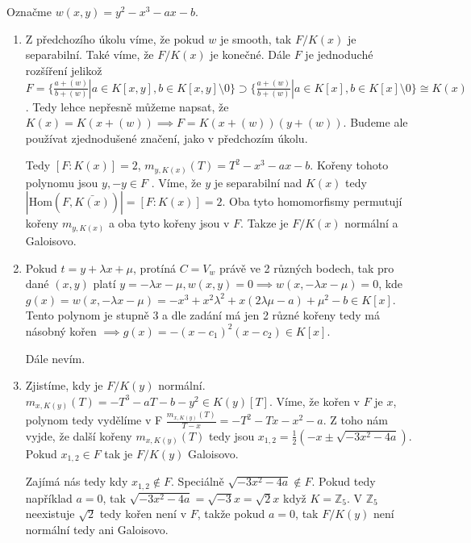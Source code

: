 \documentclass[12pt, a4paper]{article}
\begin{document}
\section{}
Označme $w(x,y)=y^2-x^3-ax-b$.
\begin{enumerate}[label=(\alph*)]
    \item Z předchozího úkolu víme, že pokud $w$ je smooth, tak $F/K(x)$ je separabilní. Také víme, že $F/K(x)$ je konečné. Dále $F$ je jednoduché rozšíření jelikož $F = \{\frac{a+(w)}{b+(w)}| a \in K[x,y], b \in K[x,y] \setminus 0 \} \supset \{\frac{a+(w)}{b+(w)}| a \in K[x], b \in K[x] \setminus 0 \} \cong K(x)$. Tedy lehce nepřesně můžeme napsat, že $K(x)=K(x+(w)) \implies F = K(x+(w))(y+(w))$. Budeme ale používat zjednodušené značení, jako v předchozím úkolu. 

    Tedy $[F:K(x)]=2$, $m_{y,K(x)}(T)=T^2 - x^3 - ax -b$. Kořeny tohoto polynomu jsou $y,-y \in F$ . Víme, že $y$ je separabilní nad $K(x)$ tedy  $|\text{Hom}(F,\bar{K(x)})|=[F:K(x)]=2$. Oba tyto homomorfismy permutují kořeny $m_{y,K(x)}$ a oba tyto kořeny jsou v $F$. Takze je $F/K(x)$ normální a Galoisovo.
    \item Pokud $t=y+\lambda x + \mu$, protíná $C=V_w$ právě ve 2 různých bodech, tak pro dané $(x,y)$ platí $y=-\lambda x - \mu, w(x,y)=0 \implies w(x,-\lambda x - \mu) = 0$, kde $g(x)=w(x,-\lambda x - \mu) = -x^3+x^2 \lambda^2 + x(2\lambda \mu -a)+\mu^2 -b \in K[x]$. Tento polynom je stupně $3$ a dle zadání má jen 2 různé kořeny tedy má násobný kořen $\implies g(x)=-(x-c_1)^2(x-c_2) \in K[x]$. 

    Dále nevím.

    \item Zjistíme, kdy je $F/K(y)$ normální. $m_{x,K(y)}(T) = -T^3-aT-b-y^2 \in K(y)[T]$. Víme, že kořen v $F$ je $x$, polynom tedy vydělíme v F $\frac{m_{x,K(y)}(T)}{T-x} = -T^2-Tx-x^2-a$. Z toho nám vyjde, že další kořeny $m_{x,K(y)}(T)$ tedy jsou $x_{1,2} = \frac{1}{2}(-x\pm \sqrt{-3x^2-4a})$. Pokud $x_{1,2} \in F$ tak je $F/K(y)$ Galoisovo. 

    Zajímá nás tedy kdy $x_{1,2} \notin F$. Speciálně $\sqrt{-3x^2-4a} \notin F$. Pokud tedy například $a = 0$, tak $\sqrt{-3x^2-4a}=\sqrt{-3}x = \sqrt{2}x$ když $K = \mathbb{Z}_5$. V $\mathbb{Z}_5$ neexistuje $\sqrt{2}$ tedy kořen není v $F$, takže pokud $a=0$, tak $F/K(y)$ není normální tedy ani Galoisovo.
\end{enumerate}
\end{document}
